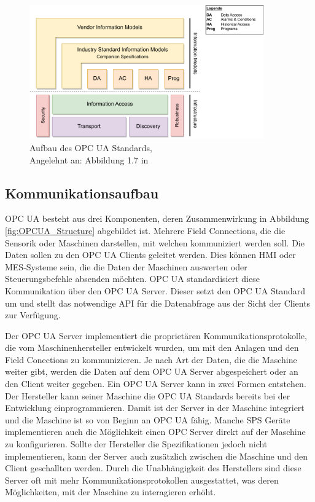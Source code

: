 \documentclass[a4paper, 12pt, oneside]{scrbook}
\begin{document}
		
		\begin{figure}[H]
			\centering
			\includegraphics[width=0.9\textwidth]{res/diagramms/companionSpezifikations.pdf}
			\caption{Aufbau des OPC UA Standards, \\ Angelehnt an: Abbildung 1.7 in \cite{mahnke_opc_2009}} %
			\label{fig:OPCUA_Framework}
		\end{figure}
	
		\subsection{Kommunikationsaufbau} 
		
		OPC UA besteht aus drei Komponenten, deren Zusammenwirkung in Abbildung \ref{fig:OPCUA_Structure} abgebildet ist. Mehrere Field Connections, die die Sensorik oder Maschinen darstellen, mit welchen kommuniziert werden soll. Die Daten sollen zu den OPC UA Clients geleitet werden. Dies können \ac{HMI} oder MES-Systeme sein, die die Daten der Maschinen auswerten oder Steuerungsbefehle absenden möchten. OPC UA standardisiert diese Kommunikation über den OPC UA Server. Dieser setzt den OPC UA Standard um und stellt das notwendige \ac{API} für die Datenabfrage aus der Sicht der Clients zur Verfügung. \cite{rinke_was_2022}
		
		Der OPC UA Server implementiert die proprietären Kommunikationsprotokolle, die vom Maschinenhersteller entwickelt wurden, um mit den Anlagen und den Field Conections zu kommunizieren. Je nach Art der Daten, die die Maschine weiter gibt, werden die Daten auf dem OPC UA Server abgespeichert oder an den Client weiter gegeben. Ein OPC UA Server kann in zwei Formen entstehen. Der Hersteller kann seiner Maschine die OPC UA Standards bereits bei der Entwicklung einprogrammieren. Damit ist der Server in der Maschine integriert und die Maschine ist so von Beginn an OPC UA fähig. Manche SPS Geräte implementieren auch die Möglichkeit einen OPC Server direkt auf der Maschine zu konfigurieren. Sollte der Hersteller die Spezifikationen jedoch nicht implementieren, kann der Server auch zusätzlich zwischen die Maschine und den Client geschallten werden. Durch die Unabhängigkeit des Herstellers sind diese Server oft mit mehr Kommunikationsprotokollen ausgestattet, was deren Möglichkeiten, mit der Maschine zu interagieren erhöht. \cite{rinke_was_2022}
		
\end{document}
